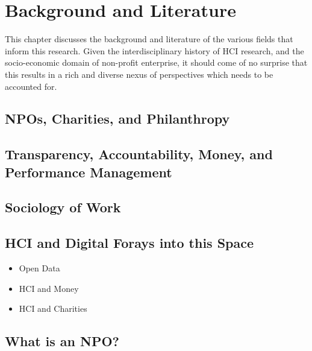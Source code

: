 \chapter{Background and Literature}
\label{sec:related}

This chapter discusses the background and literature of the various fields that inform this research. Given the interdisciplinary history of HCI research, and the socio-economic domain of non-profit enterprise, it should come of no surprise that this results in a rich and diverse nexus of perspectives which needs to be accounted for.

\section{NPOs, Charities, and Philanthropy}

\section{Transparency, Accountability, Money, and Performance Management}

\section{Sociology of Work}

\section{HCI and Digital Forays into this Space}
\begin{itemize}
\item Open Data
\item HCI and Money
\item HCI and Charities
\end{itemize}



\section{What is an NPO?}


